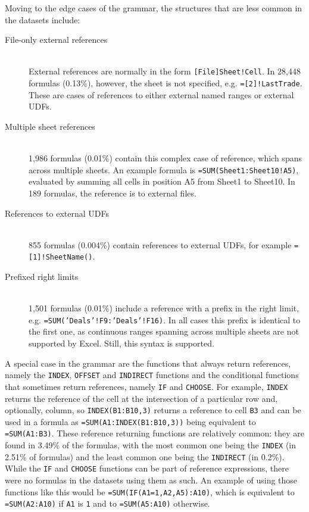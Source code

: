 \documentclass[conference]{IEEEtran}
\begin{document}
Moving to the edge cases of the grammar, the structures that are less common in the datasets include:
\begin{description}
	\item[File-only external references] \hfill \\
	External references are normally in the form \texttt{[File]Sheet!Cell}. In 28,448 formulas (0.13\%), however, the sheet is not specified, e.g. \texttt{=[2]!LastTrade}. These are cases of references to either external named ranges or external UDFs.
	\item[Multiple sheet references] \hfill \\
	1,986 formulas (0.01\%) contain this complex case of reference, which spans across multiple sheets. An example formula is \texttt{=SUM(Sheet1:Sheet10!A5)}, evaluated by summing all cells in position A5 from Sheet1 to Sheet10. In 189 formulas, the reference is to external files.
	\item[References to external UDFs] \hfill \\
	855 formulas (0.004\%) contain references to external UDFs, for example \texttt{=[1]!SheetName()}.
	\item[Prefixed right limits] \hfill \\
	1,501 formulas (0.01\%) include a reference with a prefix in the right limit, e.g. \texttt{=SUM('Deals'!F9:'Deals'!F16)}. In all cases this prefix is identical to the first one, as continuous ranges spanning across multiple sheets are not supported by Excel. Still, this syntax is supported.
\end{description}

A special case in the grammar are the functions that always return references, namely the \texttt{INDEX}, \texttt{OFFSET} and \texttt{INDIRECT} functions and the conditional functions that sometimes return references, namely \texttt{IF} and \texttt{CHOOSE}.
For example, \texttt{INDEX} returns the reference of the cell at the intersection of a particular row and, optionally, column, so \texttt{INDEX(B1:B10,3)} returns a reference to cell \texttt{B3} and can be used in a formula as \texttt{=SUM(A1:INDEX(B1:B10,3))} being equivalent to \texttt{=SUM(A1:B3)}.
These reference returning functions are relatively common: they are found in 3.49\% of the formulas, with the most common one being the \texttt{INDEX} (in 2.51\% of formulas) and the least common one being the \texttt{INDIRECT} (in 0.2\%).
While the \texttt{IF} and \texttt{CHOOSE} functions can be part of reference expressions, there were no formulas in the datasets using them as such.
An example of using those functions like this would be \texttt{=SUM(IF(A1=1,A2,A5):A10)}, which is equivalent to \texttt{=SUM(A2:A10)} if \texttt{A1} is \texttt{1} and to \texttt{=SUM(A5:A10)} otherwise.
\end{document}
